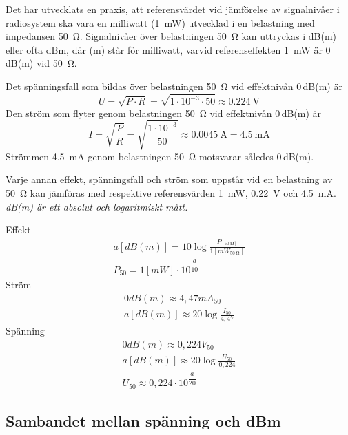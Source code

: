 Det har utvecklats en praxis, att referensvärdet vid jämförelse av signalnivåer
i radiosystem ska vara en milliwatt (\qty{1}{\milli\watt}) utvecklad i en
belastning med impedansen \qty{50}{\ohm}.
Signalnivåer över belastningen \qty{50}{\ohm} kan uttryckas i dB(m) eller ofta
dBm, där (m) står för milliwatt, varvid referenseffekten \qty{1}{\milli\watt} är
0\,dB(m) vid \qty{50}{\ohm}.

Det spänningsfall som bildas över belastningen \qty{50}{\ohm} vid effektnivån
0\,dB(m) är
\[U = \sqrt{P\cdot R} = \sqrt{1\cdot 10^{-3} \cdot 50} \approx \qty{0,224}{\volt}\]
Den ström som flyter genom belastningen \qty{50}{\ohm} vid effektnivån 0\,dB(m)
är
\[
I = \sqrt{\frac{P}{R}} = \sqrt{\frac{1\cdot 10^{-3}}{50}} \approx \qty{0,0045}{\ampere} = \qty{4,5}{\milli\ampere}
\]
Strömmen \qty{4,5}{\milli\ampere} genom belastningen \qty{50}{\ohm} motsvarar
således 0\,dB(m).

Varje annan effekt, spänningsfall och ström som uppstår vid en belastning av
\qty{50}{\ohm} kan jämföras med respektive referensvärden \qty{1}{\milli\watt},
\qty{0,22}{\volt} och \qty{4,5}{\milli\ampere}.
\emph{dB(m) är ett absolut och logaritmiskt mått.}

\vspace*{1ex}
\noindent
Effekt
\begin{gather*}
	a [dB(m)] = 10 \log\frac{P_{[\qty{50}{\ohm}]}}{1[mW_{\qty{50}{\ohm}}]} \\
	P_{50} = 1 [mW] \cdot 10^{\dfrac{a}{10}}
\end{gather*}
Ström
\begin{gather*}
	0 dB(m) \approx 4,47 mA_{50} \\
	a [dB(m)] \approx 20 \log\frac{I_{50}}{4,47}
\end{gather*}
Spänning
\begin{gather*}
	0 dB(m) \approx 0,224 V_{50} \\
	a [dB(m)] \approx 20 \log\frac{U_{50}}{0,224} \\
	U_{50} \approx 0,224 \cdot 10^{\dfrac{a}{20}}
\end{gather*}

\subsection[Sambandet spänning och dBm]{Sambandet mellan spänning och dBm}

